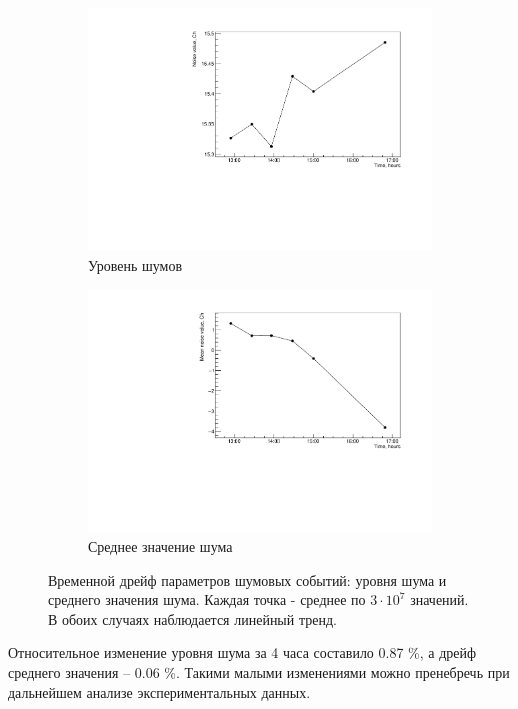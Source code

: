 \begin{figure}[H]
\centering
\begin{subfigure}{.5\textwidth}
	\centering
	\includegraphics[width=1\linewidth]{img/Noise_time_drift.pdf}
	\caption{Уровень шумов}
\end{subfigure}%
\begin{subfigure}{.5\textwidth}
	\centering
	\includegraphics[width=1\linewidth]{img/Mean_time_drift.pdf}
	\caption{Среднее значение шума}
\end{subfigure}
\caption{Временной дрейф параметров шумовых событий: уровня шума и среднего значения шума. Каждая точка - среднее по $3\cdot10^7$ значений. В обоих случаях наблюдается линейный тренд.}
\label{fig:Noise_gr}
\end{figure}
Относительное изменение уровня шума за 4 часа составило 0.87 \%, а дрейф среднего значения -- 0.06 \%. Такими малыми изменениями можно пренебречь при дальнейшем анализе экспериментальных данных.  

